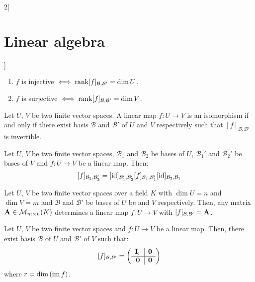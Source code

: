 \documentclass[../../../main.tex]{subfiles}
\begin{document}
\begin{multicols}{2}[\section{Linear algebra}]
\begin{corollary}
    \begin{enumerate}
      \item $f$ is injective $\iff\rank[f]_{\mathcal{B},\mathcal{B}'}=\dim U$.
      \item $f$ is surjective $\iff\rank[f]_{\mathcal{B},\mathcal{B}'}=\dim V$.
    \end{enumerate}
  \end{corollary}
  \begin{corollary}
    Let $U$, $V$ be two finite vector spaces. A linear map $f:U\rightarrow V$ is an isomorphism if and only if there exist basis $\mathcal{B}$ and $\mathcal{B}'$ of $U$ and $V$ respectively such that $[f]_{\mathcal{B},\mathcal{B}'}$ is invertible.
  \end{corollary}
  \begin{prop}
    Let $U$, $V$ be two finite vector spaces, $\mathcal{B}_1$ and $\mathcal{B}_2$ be bases of $U$, $\mathcal{B}_1'$ and $\mathcal{B}_2'$ be bases of $V$ and $f:U\rightarrow V$ be a linear map. Then: $$[f]_{\mathcal{B}_2,\mathcal{B}_2'}=[\mathrm{id}]_{\mathcal{B}_1',\mathcal{B}_2'}[f]_{\mathcal{B}_1,\mathcal{B}_1'}[\mathrm{id}]_{\mathcal{B}_2,\mathcal{B}_1}$$
  \end{prop}
  \begin{lemma}
    Let $U$, $V$ be two finite vector spaces over a field $K$ with $\dim U=n$ and $\dim V=m$ and $\mathcal{B}$ and $\mathcal{B}'$ be bases of $U$ be and $V$ respectively. Then, any matrix $\boldsymbol{\mathrm{A}}\in\mathcal{M}_{m\times n}(K)$ determines a linear map $f:U\rightarrow V$ with $[f]_{\mathcal{B},\mathcal{B}'}=\boldsymbol{\mathrm{A}}$.
  \end{lemma}
  \begin{theorem}
    Let $U$, $V$ be two finite vector spaces and $f:U\rightarrow V$ be a linear map. Then, there exist basis $\mathcal{B}$ of $U$ and $\mathcal{B}'$ of $V$ such that:
    $$[f]_{\mathcal{B},\mathcal{B}'}=\left(
      \begin{array}{c|c}
          \boldsymbol{\mathrm{I}}_r & \boldsymbol{\mathrm{0}} \\
          \hline
          \boldsymbol{\mathrm{0}}   & \boldsymbol{\mathrm{0}}
        \end{array}\right)$$
    where $r=\dim\left(\operatorname{im} f\right)$.
  \end{theorem}

\end{multicols}
\end{document}
